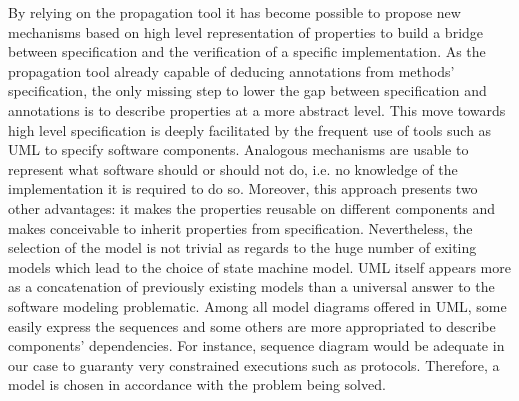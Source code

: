 By relying on the propagation tool it has become possible to propose new mechanisms based on high level representation of properties to build a bridge between specification and the verification of a specific implementation. As the propagation tool already capable of deducing annotations from methods' specification, the only missing step to lower the gap between specification and annotations is to describe properties at a more abstract level. This move towards high level specification is deeply facilitated by the frequent use of tools such as UML to specify software components. Analogous mechanisms are usable to represent what software should or should not do, i.e. no knowledge of the implementation it is required to do so. Moreover, this approach presents two other advantages: it makes the properties reusable on different components and makes conceivable to inherit properties from specification.
Nevertheless, the selection of the model is not trivial as regards to the huge number of exiting models which lead to the choice of state machine model. UML itself appears more as a concatenation of previously existing models than a universal answer to the software modeling problematic. Among all model diagrams offered in UML, some easily express the sequences and some others are more appropriated to describe components' dependencies. For instance, sequence diagram would be adequate in our case to guaranty very constrained executions such as protocols. Therefore, a model is chosen in accordance with the problem being solved. 
